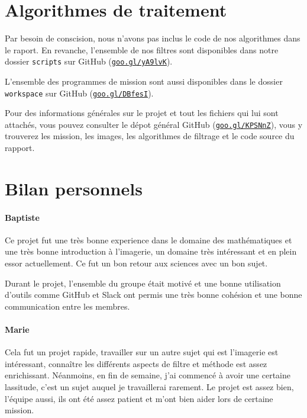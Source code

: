 \documentclass[12pt]{article}
\begin{document}
\section{Algorithmes de traitement}

Par besoin de conscision, nous n'avons pas inclus le code de nos algorithmes dans le raport. En revanche, l'ensemble de nos filtres sont disponibles dans notre dossier \texttt{scripts} sur GitHub (\href{https://github.com/Exia-epickiwi/exolife/tree/master/scripts}{\texttt{goo.gl/yA9lvK}}).

L'ensemble des programmes de mission sont aussi disponibles dans le dossier \texttt{workspace} sur GitHub (\href{https://github.com/Exia-epickiwi/exolife/tree/master/workspace}{\texttt{goo.gl/DBfesI}}).

Pour des informations générales sur le projet et tout les fichiers qui lui sont attachés, vous pouvez consulter le dépot général GitHub (\href{https://github.com/Exia-epickiwi/exolife}{\texttt{goo.gl/KPSNnZ}}), vous y trouverez les mission, les images, les algorithmes de filtrage et le code source du rapport.

\section{Bilan personnels}

\paragraph{ Baptiste} Ce projet fut une très bonne experience dans le domaine des mathématiques et une très bonne introduction à l'imagerie, un domaine très intéressant et en plein essor actuellement. Ce fut un bon retour aux sciences avec un bon sujet.

Durant le projet, l'ensemble du groupe était motivé et une bonne utilisation d'outils comme GitHub et Slack ont permis une très bonne cohésion et une bonne communication entre les membres.

\paragraph{ Marie}

Cela fut un projet rapide, travailler sur un autre sujet qui est l'imagerie est intéressant, connaître les différents aspects de filtre et méthode est assez enrichissant. Néanmoins, en fin de semaine, j'ai commencé à avoir une certaine lassitude, c'est un sujet auquel je travaillerai rarement. Le projet est assez bien, l'équipe aussi, ils ont été assez patient et m'ont bien aider lors de certaine mission.
\end{document}
